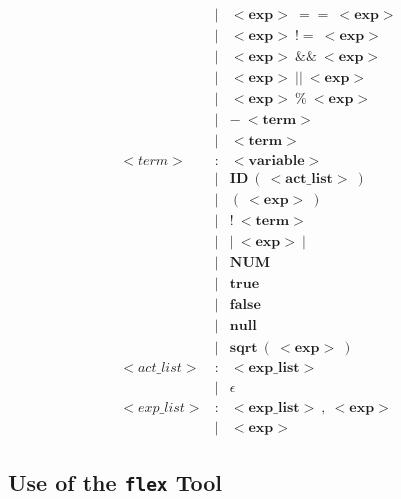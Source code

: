 \documentclass{article}
\begin{document}
\begin{align*}
    & | & <\boldsymbol{exp}>\ \boldsymbol{==}\ <\boldsymbol{exp}>\ \\
    & | & <\boldsymbol{exp}>\ \boldsymbol{!=}\ <\boldsymbol{exp}>\ \\
    & | & <\boldsymbol{exp}>\ \boldsymbol{\&\&}\ <\boldsymbol{exp}>\ \\
    & | & <\boldsymbol{exp}>\ \boldsymbol{||}\ <\boldsymbol{exp}>\ \\
    & | & <\boldsymbol{exp}>\ \boldsymbol{\%}\ <\boldsymbol{exp}> \\
    & | & \boldsymbol{-}\ <\boldsymbol{term}>\ \\
    & | & <\boldsymbol{term}>\ \\
    <term> & : & <\boldsymbol{variable}> \\
    & | & \boldsymbol{ID}\ (\ <\boldsymbol{act\_list}>\ ) \\
    & | & (\ <\boldsymbol{exp}>\ ) \\
    & | & !\ <\boldsymbol{term}> \\
    & | & |\ <\boldsymbol{exp}>\ | \\
    & | & \boldsymbol{NUM}	\\
    & | & \boldsymbol{true} \\
    & | & \boldsymbol{false} \\
    & | & \boldsymbol{null} \\
    & | & \boldsymbol{sqrt}\ (\ <\boldsymbol{exp}>\ ) \\
    <act\_list> & : & <\boldsymbol{exp\_list}> \\
    & | & \epsilon \\
    <exp\_list> & : & <\boldsymbol{exp\_list}>\ ,\ <\boldsymbol{exp}> \\
    & | & <\boldsymbol{exp}>
    \end{align*}
\begingroup\vspace*{-\baselineskip}
\vspace*{\baselineskip}\endgroup

\subsection{Use of the {\tt flex} Tool}
\end{document}
